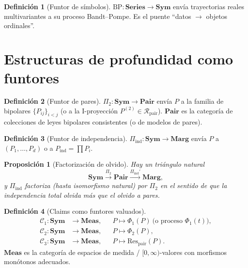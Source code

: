 \documentclass[11pt,a4paper]{article}
\theoremstyle{definition}
\newtheorem{definition}{Definici\'on}[section]
\theoremstyle{plain}
\newtheorem{proposition}{Proposici\'on}[section]
\theoremstyle{remark}
\newcommand{\Res}{\mathrm{Res}}
\newcommand{\Rpair}{\mathcal{R}_{\mathrm{pair}}}
\begin{document}
\begin{definition}[Funtor de s\'imbolos]
\label{def:BP}
$\mathrm{BP}:\mathbf{Series}\to\mathbf{Sym}$ env\'ia trayectorias
reales multivariantes a su proceso Bandt--Pompe. Es el puente
``datos $\to$ objetos ordinales''.
\end{definition}

\section{Estructuras de profundidad como funtores}
\label{sec:depth}

\begin{definition}[Funtor de pares]
\label{def:Pi2}
$\Pi_2:\mathbf{Sym}\to\mathbf{Pair}$ env\'ia $P$ a la familia de
bipolares $\{P_{ij}\}_{i<j}$ (o a la I-proyecci\'on $P^{(2)}\in\Rpair$).
$\mathbf{Pair}$ es la categor\'ia de colecciones de leyes bipolares
consistentes (o de modelos de pares).
\end{definition}

\begin{definition}[Funtor de independencia]
\label{def:Pi1}
$\Pi_{\mathrm{ind}}:\mathbf{Sym}\to\mathbf{Marg}$ env\'ia $P$ a
$(P_1,\ldots,P_d)$ o a $P_{\mathrm{ind}}=\prod P_i$.
\end{definition}

\begin{proposition}[Factorizaci\'on de olvido]
\label{prop:forget}
Hay un tri\'angulo natural
\begin{equation}
\mathbf{Sym}
\xrightarrow{\Pi_2}
\mathbf{Pair}
\xrightarrow{\Pi_{\mathrm{ind}}'}
\mathbf{Marg},
\end{equation}
y $\Pi_{\mathrm{ind}}$ factoriza (hasta isomorfismo natural) por
$\Pi_2$ en el sentido de que la independencia total olvida m\'as que el
olvido a pares.
\end{proposition}

\begin{definition}[Claims como funtores valuados]
\label{def:claims_fun}
\begin{align}
\mathcal{C}_1:\mathbf{Sym}&\to\mathbf{Meas},&
&P\mapsto\Phi_1(P)\ \text{(o proceso $\Phi_1(t)$)},\\
\mathcal{C}_2:\mathbf{Sym}&\to\mathbf{Meas},&
&P\mapsto\Phi_2(P),\\
\mathcal{C}_3:\mathbf{Sym}&\to\mathbf{Meas},&
&P\mapsto\Res_{\mathrm{pair}}(P).
\end{align}
$\mathbf{Meas}$ es la categor\'ia de espacios de medida / $[0,\infty)$-valores
con morfismos mon\'otonos adecuados.
\end{definition}
\end{document}
